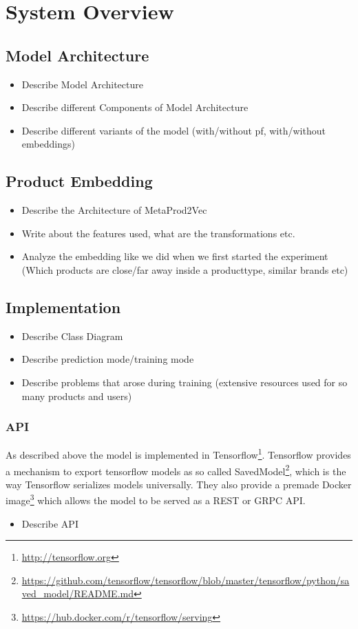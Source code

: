 \chapter{System Overview}

\section{Model Architecture}
\begin{itemize}
\item Describe Model Architecture
\item Describe different Components of Model Architecture
\item Describe different variants of the model (with/without pf, with/without embeddings)
\end{itemize}

\section{Product Embedding}
\begin{itemize}
    \item Describe the Architecture of MetaProd2Vec
    \item Write about the features used, what are the transformations etc.
    \item Analyze the embedding like we did when we first started the experiment (Which products are close/far away inside a producttype, similar brands etc)
\end{itemize}

\section{Implementation}

\begin{itemize}
\item Describe Class Diagram
\item Describe prediction mode/training mode
\item Describe problems that arose during training (extensive resources used for so many products and users)
\end{itemize}
\subsection{API}\label{api}
As described above the model is implemented in Tensorflow\footnote{\url{http://tensorflow.org}}.
Tensorflow provides a mechanism to export tensorflow models as so called SavedModel\footnote{\url{https://github.com/tensorflow/tensorflow/blob/master/tensorflow/python/saved_model/README.md}}, which is the way Tensorflow serializes models universally.
They also provide a premade Docker image\footnote{\url{https://hub.docker.com/r/tensorflow/serving}} which allows the model to be served as a REST or GRPC API.
\begin{itemize}
\item Describe API
\end{itemize}

